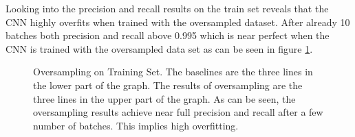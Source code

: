 Looking into the precision and recall results on the train set reveals that the CNN highly overfits when trained with the oversampled dataset. After already 10 batches both precision and recall above 0.995 which is near perfect when the CNN is trained with the oversampled data set as can be seen in figure \ref{fig:over_train}.
\begin{figure}[!ht]
    \centering
    \par\medskip
    \centering
    \par\medskip  \caption{Oversampling on Training Set. The baselines are the three lines in the lower part of the graph. The results of oversampling are the three lines in the upper part of the graph. As can be seen, the oversampling results achieve near full precision and recall after a few number of batches. This implies high overfitting.}
  \label{fig:over_train}
\end{figure}

